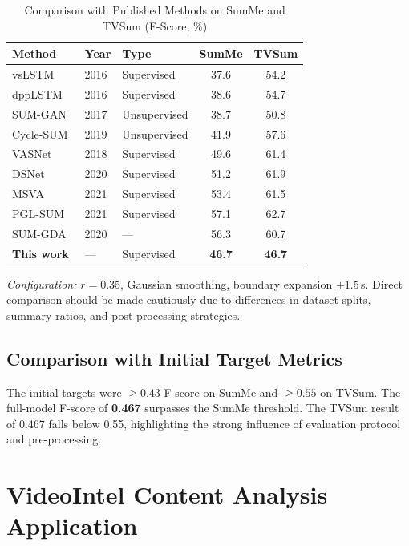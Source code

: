\documentclass[10pt,conference]{IEEEtran}
\begin{document}
\begin{table}[h]
\centering
\caption{Comparison with Published Methods on SumMe and TVSum (F-Score, \%)}
\label{tab:literature}
\begin{tabular}{lllcc}
\toprule
\textbf{Method} & \textbf{Year} & \textbf{Type} & \textbf{SumMe} & \textbf{TVSum} \\
\midrule
vsLSTM~\cite{zhang2016lstm}       & 2016 & Supervised   & 37.6 & 54.2 \\
dppLSTM~\cite{zhang2016lstm}      & 2016 & Supervised   & 38.6 & 54.7 \\
SUM-GAN~\cite{mahasseni2017}      & 2017 & Unsupervised & 38.7 & 50.8 \\
Cycle-SUM~\cite{zhang2019}        & 2019 & Unsupervised & 41.9 & 57.6 \\
VASNet~\cite{fajtl2018}           & 2018 & Supervised   & 49.6 & 61.4 \\
DSNet~\cite{zhu2021dsnet}         & 2020 & Supervised   & 51.2 & 61.9 \\
MSVA~\cite{ghauri2021}            & 2021 & Supervised   & 53.4 & 61.5 \\
PGL-SUM~\cite{apostolidis2021pgl} & 2021 & Supervised   & 57.1 & 62.7 \\
SUM-GDA                           & 2020 & ---          & 56.3 & 60.7 \\
\midrule
\textbf{This work}                & ---  & Supervised   & \textbf{46.7} & \textbf{46.7} \\
\bottomrule
\end{tabular}
\end{table}

\textit{Configuration:} $r{=}0.35$, Gaussian smoothing, boundary expansion
$\pm 1.5$\,s. Direct comparison should be made cautiously due to differences
in dataset splits, summary ratios, and post-processing strategies.

\subsection{Comparison with Initial Target Metrics}

The initial targets were $\ge 0.43$ F-score on SumMe and $\ge 0.55$ on TVSum.
The full-model F-score of \textbf{0.467} surpasses the SumMe threshold. The
TVSum result of 0.467 falls below 0.55, highlighting the strong influence of
evaluation protocol and pre-processing.

\section{VideoIntel Content Analysis Application}
\end{document}
